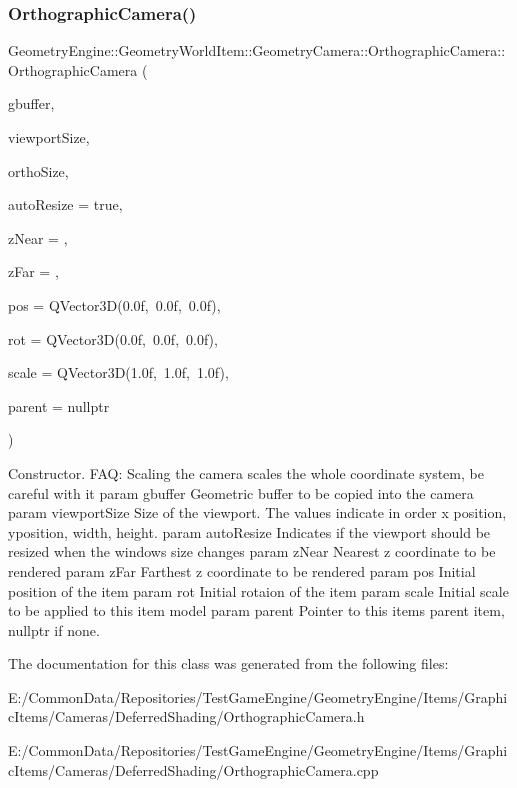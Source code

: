 \subsubsection{\texorpdfstring{OrthographicCamera()}{OrthographicCamera()}}
{\footnotesize\ttfamily Geometry\+Engine\+::\+Geometry\+World\+Item\+::\+Geometry\+Camera\+::\+Orthographic\+Camera\+::\+Orthographic\+Camera (\begin{DoxyParamCaption}\item[{const \mbox{\hyperlink{class_geometry_engine_1_1_geometry_buffer_1_1_g_buffer}{Geometry\+Buffer\+::\+G\+Buffer}} \&}]{gbuffer,  }\item[{const Q\+Vector4D \&}]{viewport\+Size,  }\item[{const Q\+Rect \&}]{ortho\+Size,  }\item[{bool}]{auto\+Resize = {\ttfamily true},  }\item[{G\+Ldouble}]{z\+Near = {},  }\item[{G\+Ldouble}]{z\+Far = {},  }\item[{const Q\+Vector3D \&}]{pos = {\ttfamily QVector3D(0.0f,~0.0f,~0.0f)},  }\item[{const Q\+Vector3D \&}]{rot = {\ttfamily QVector3D(0.0f,~0.0f,~0.0f)},  }\item[{const Q\+Vector3D \&}]{scale = {\ttfamily QVector3D(1.0f,~1.0f,~1.0f)},  }\item[{\mbox{\hyperlink{class_geometry_engine_1_1_geometry_world_item_1_1_world_item}{World\+Item}} $\ast$}]{parent = {\ttfamily nullptr} }\end{DoxyParamCaption})}

Constructor. F\+AQ\+: Scaling the camera scales the whole coordinate system, be careful with it param gbuffer Geometric buffer to be copied into the camera param viewport\+Size Size of the viewport. The values indicate in order x position, yposition, width, height. param auto\+Resize Indicates if the viewport should be resized when the window\textquotesingle{}s size changes param z\+Near Nearest z coordinate to be rendered param z\+Far Farthest z coordinate to be rendered param pos Initial position of the item param rot Initial rotaion of the item param scale Initial scale to be applied to this item model param parent Pointer to this items parent item, nullptr if none. 

The documentation for this class was generated from the following files\+:\begin{DoxyCompactItemize}
\item 
E\+:/\+Common\+Data/\+Repositories/\+Test\+Game\+Engine/\+Geometry\+Engine/\+Items/\+Graphic\+Items/\+Cameras/\+Deferred\+Shading/Orthographic\+Camera.\+h\item 
E\+:/\+Common\+Data/\+Repositories/\+Test\+Game\+Engine/\+Geometry\+Engine/\+Items/\+Graphic\+Items/\+Cameras/\+Deferred\+Shading/Orthographic\+Camera.\+cpp\end{DoxyCompactItemize}
